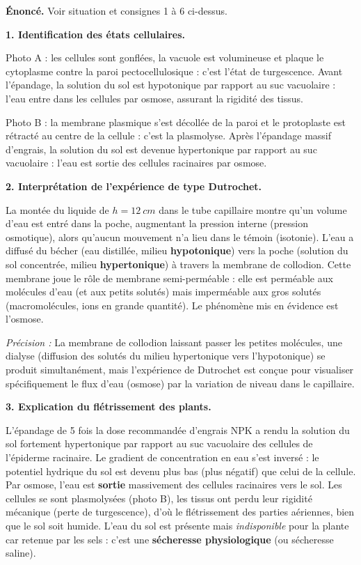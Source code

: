 \documentclass[11pt]{article}
\newcommand{\cle}[1]{{\popxbold\color{popdark}#1}}
\newcounter{popsec}
\newcounter{popsub}
\newcommand{\courssub}[1]{%
  \stepcounter{popsub}%
  \par\vspace{9pt}\noindent{\popxbold\fontsize{11.5}{13}\selectfont\color{popink}{\color{poporange}\thepopsec.\thepopsub}\hspace{6pt}#1}\par\nopagebreak\vspace{4pt}
}
\begin{document}
\courssub{Démarche et corrigé commenté}

\begin{exoresolu}
\textbf{Énoncé.} Voir situation et consignes 1 à 6 ci-dessus.

\tcblower

\textbf{1. Identification des états cellulaires.}

Photo A : les cellules sont gonflées, la vacuole est volumineuse et plaque le cytoplasme contre la paroi pectocellulosique : c'est l'état de \cle{turgescence}. Avant l'épandage, la solution du sol est hypotonique par rapport au suc vacuolaire : l'eau entre dans les cellules par osmose, assurant la rigidité des tissus.

Photo B : la membrane plasmique s'est décollée de la paroi et le protoplaste est rétracté au centre de la cellule : c'est la \cle{plasmolyse}. Après l'épandage massif d'engrais, la solution du sol est devenue hypertonique par rapport au suc vacuolaire : l'eau est sortie des cellules racinaires par osmose.

\textbf{2. Interprétation de l'expérience de type Dutrochet.}

La montée du liquide de $h = \SI{12}{cm}$ dans le tube capillaire montre qu'un volume d'eau est entré dans la poche, augmentant la pression interne (pression osmotique), alors qu'aucun mouvement n'a lieu dans le témoin (isotonie). L'eau a diffusé du bécher (eau distillée, milieu \textbf{hypotonique}) vers la poche (solution du sol concentrée, milieu \textbf{hypertonique}) à travers la membrane de collodion. Cette membrane joue le rôle de \cle{membrane semi-perméable} : elle est perméable aux molécules d'eau (et aux petits solutés) mais imperméable aux gros solutés (macromolécules, ions en grande quantité). Le phénomène mis en évidence est l'\cle{osmose}.

\textit{Précision :} La membrane de collodion laissant passer les petites molécules, une \cle{dialyse} (diffusion des solutés du milieu hypertonique vers l'hypotonique) se produit simultanément, mais l'expérience de Dutrochet est conçue pour visualiser spécifiquement le flux d'eau (osmose) par la variation de niveau dans le capillaire.

\textbf{3. Explication du flétrissement des plants.}

L'épandage de 5 fois la dose recommandée d'engrais NPK a rendu la solution du sol fortement \cle{hypertonique} par rapport au suc vacuolaire des cellules de l'épiderme racinaire. Le gradient de concentration en eau s'est inversé : le potentiel hydrique du sol est devenu plus bas (plus négatif) que celui de la cellule. Par osmose, l'eau est \textbf{sortie} massivement des cellules racinaires vers le sol. Les cellules se sont plasmolysées (photo B), les tissus ont perdu leur rigidité mécanique (perte de turgescence), d'où le flétrissement des parties aériennes, bien que le sol soit humide. L'eau du sol est présente mais \emph{indisponible} pour la plante car retenue par les sels : c'est une \textbf{sécheresse physiologique} (ou sécheresse saline).


\end{exoresolu}
\end{document}
